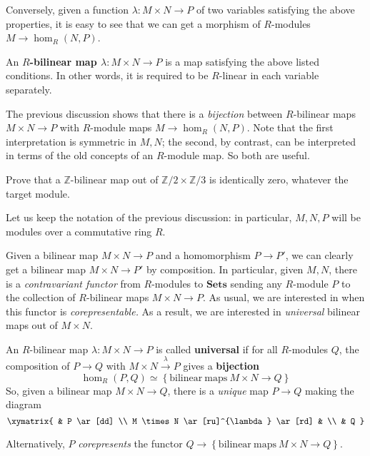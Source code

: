 Conversely, given a function $\lambda: M \times N \to P$ of two variables satisfying the above properties,
it is easy to see that we can get a morphism of $R$-modules $M \to
\hom_R(N,P)$.



\begin{definition}
An \textbf{$R$-bilinear map $\lambda: M \times N \to P$} is a map satisfying
the above listed conditions. In other words, it is required to be $R$-linear
in each variable separately.
\end{definition}

The previous discussion shows that there is a \emph{bijection} between $R$-bilinear
maps $M \times N \to P$ with $R$-module maps $M \to \hom_R(N,P)$.
Note that the first interpretation is symmetric in $M,N$; the second, by
contrast, can be interpreted in terms of the old concepts of an $R$-module map.
So both are useful.

\begin{exercise}
Prove that a $\mathbb{Z}$-bilinear map out of $\mathbb{Z}/2 \times
\mathbb{Z}/3$ is identically zero, whatever the target module.
\end{exercise}


Let us keep the notation of the previous discussion: in particular, $M,N, P$ will
be modules over a commutative ring $R$.

Given a bilinear map $M \times N \to P$ and a homomorphism $P \to P'$, we can
clearly get a bilinear map $M \times N \to P'$ by composition.
In particular, given $M,N$, there is a \emph{contravariant functor} from
$R$-modules to
$\mathbf{Sets}$ sending  any $R$-module $P$ to the collection of $R$-bilinear
maps $M \times N
\to P$. As usual, we are interested in when this functor is
\emph{corepresentable.}
As  a result,
we are interested in \emph{universal} bilinear maps out of $M \times N$.


\begin{definition}
An $R$-bilinear map $\lambda: M \times N \to P$ is called \textbf{universal} if
for all $R$-modules $Q$, the composition of $P \to Q$ with $M \times N
\stackrel{\lambda}{\to} P$
gives a \textbf{bijection}
\[ \hom_R(P,Q) \simeq \left\{\mathrm{bilinear \ maps} \ M \times N \to
Q\right\}  \]
So, given a bilinear map $M \times N \to Q$, there is a \textit{unique} map $P
\to Q$ making the diagram
\[
\xymatrix{
& P \ar[dd] \\
M \times N \ar[ru]^{\lambda} \ar[rd] & \\
& Q
}
\]

Alternatively, $P$ \emph{corepresents} the functor $Q \to
\left\{\mathrm{bilinear \ maps \ } M \times N \to Q\right\}$.
\end{definition}

